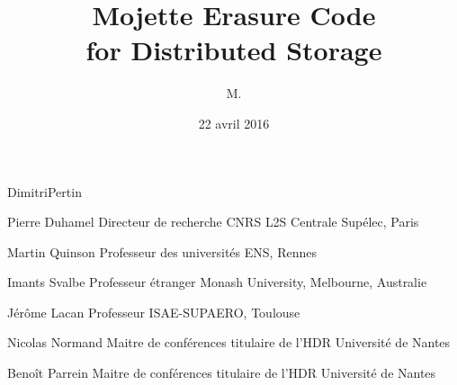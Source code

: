 



\title{Mojette Erasure Code\\
    for Distributed Storage}



\author{M.}{Dimitri}{Pertin}






\thesisnumber{}

\date{22 avril 2016}

    {Pierre}
    {Duhamel}
    {Directeur de recherche CNRS}
    {L2S Centrale Supélec, Paris}

    {Martin}
    {Quinson}
    {Professeur des universités}
    {ENS, Rennes}

    {Imants}
    {Svalbe}
    {Professeur étranger}
    {Monash University, Melbourne, Australie}

    {Jérôme}
    {Lacan}
    {Professeur}
    {ISAE-SUPAERO, Toulouse}

    {Nicolas}
    {Normand}
    {Maitre de conférences titulaire de l'HDR}
    {Université de Nantes}
 
    {Benoît}
    {Parrein}
    {Maitre de conférences titulaire de l'HDR}
    {Université de Nantes}   





